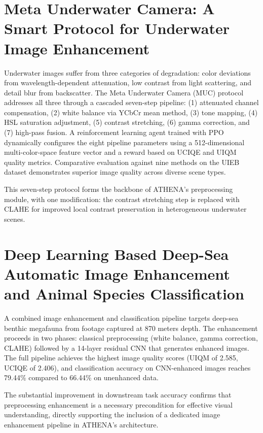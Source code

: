 \section[Wang, Sun \& Ren]{Meta Underwater Camera: A Smart Protocol for Underwater Image Enhancement~\cite{7steppipeline}}
Underwater images suffer from three categories of degradation: color deviations from wavelength-dependent attenuation, low contrast from light scattering, and detail blur from backscatter. The Meta Underwater Camera (MUC) protocol addresses all three through a cascaded seven-step pipeline: (1) attenuated channel compensation, (2) white balance via YCbCr mean method, (3) tone mapping, (4) HSL saturation adjustment, (5) contrast stretching, (6) gamma correction, and (7) high-pass fusion. A reinforcement learning agent trained with PPO dynamically configures the eight pipeline parameters using a 512-dimensional multi-color-space feature vector and a reward based on UCIQE and UIQM quality metrics. Comparative evaluation against nine methods on the UIEB dataset demonstrates superior image quality across diverse scene types.

This seven-step protocol forms the backbone of ATHENA's preprocessing module, with one modification: the contrast stretching step is replaced with CLAHE for improved local contrast preservation in heterogeneous underwater scenes.

\section[Lopez-Vazquez, Lopez-Guede, Chatzievangelou et al.]{Deep Learning Based Deep-Sea Automatic Image Enhancement and Animal Species Classification~\cite{3step}}
A combined image enhancement and classification pipeline targets deep-sea benthic megafauna from footage captured at 870 meters depth. The enhancement proceeds in two phases: classical preprocessing (white balance, gamma correction, CLAHE) followed by a 14-layer residual CNN that generates enhanced images. The full pipeline achieves the highest image quality scores (UIQM of 2.585, UCIQE of 2.406), and classification accuracy on CNN-enhanced images reaches 79.44\% compared to 66.44\% on unenhanced data.

The substantial improvement in downstream task accuracy confirms that preprocessing enhancement is a necessary precondition for effective visual understanding, directly supporting the inclusion of a dedicated image enhancement pipeline in ATHENA's architecture.

